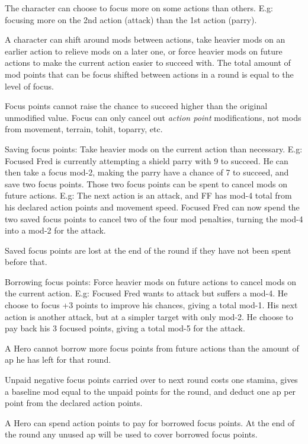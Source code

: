 \openskillslist


 The character can choose to focus more on some actions than others. E.g: focusing more on the 2nd action (attack) than the 1st action (parry).

A character can shift around mods between actions, take heavier mods on an earlier action to relieve mods on a later one, or force heavier mods on future actions to make the current action easier to succeed with. The total amount of mod points that can be focus shifted between actions in a round is equal to the level of focus.

Focus points cannot raise the chance to succeed higher than the original unmodified value. Focus can only cancel out \emph{action point} modifications, not mods from movement, terrain, tohit, toparry, etc.

Saving focus points: Take heavier mods on the current action than necessary.
E.g: Focused Fred is currently attempting a shield parry with 9 to succeed. He can then take a focus mod-2, making the parry have a chance of 7 to succeed, and save two focus points. Those two focus points can be spent to cancel mods on future actions. E.g: The next action is an attack, and FF has mod-4 total from his declared action points and movement speed. Focused Fred can now spend the two saved focus points to cancel two of the four mod penalties, turning the mod-4 into a mod-2 for the attack.

Saved focus points are lost at the end of the round if they have not been spent before that.

Borrowing focus points: Force heavier mods on future actions to cancel mods on the current action. E.g: Focused Fred wants to attack but suffers a mod-4. He choose to focus +3 points to improve his chances, giving a total mod-1. His next action is another attack, but at a simpler target with only mod-2. He choose to pay back his 3 focused points, giving a total mod-5 for the attack.

A Hero cannot borrow more focus points from future actions than the amount of ap he has left for that round.

Unpaid negative focus points carried over to next round costs one stamina, gives a baseline mod equal to the unpaid points for the round, and deduct one ap per point from the declared action points.

A Hero can spend action points to pay for borrowed focus points. At the end of the round any unused ap will be used to cover borrowed focus points.

